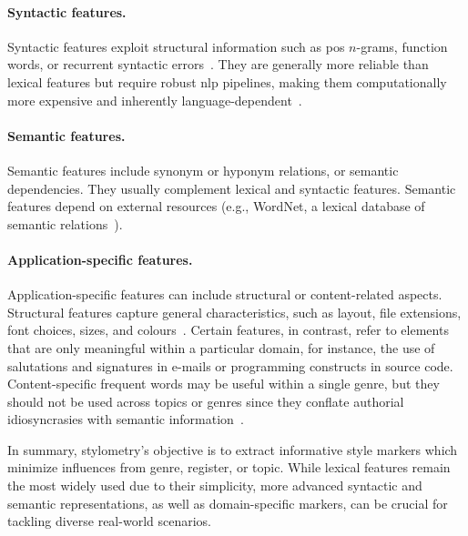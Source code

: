 \paragraph{Syntactic features.}
Syntactic features exploit structural information such as \ac{pos} $n$-grams, function words, or recurrent syntactic errors~\citep{stamatatos_survey_2009,abbasi_writeprints_2008}.
They are generally more reliable than lexical features but require robust \ac{nlp} pipelines, making them computationally more expensive and inherently language-dependent~\citep{neal_surveying_2018,stamatatos_survey_2009}.

\paragraph{Semantic features.}
Semantic features include synonym or hyponym relations, or semantic dependencies. 
They usually complement lexical and syntactic features. 
Semantic features depend on external resources (e.g., WordNet, a lexical database of semantic relations~\citep{zhou_paraphrase_2025}).


\paragraph{Application-specific features.} %

Application-specific features can include structural or content-related aspects. 
Structural features capture general characteristics, such as layout, file extensions, font choices, sizes, and colours~\citep{abbasi_writeprints_2008,neal_surveying_2018}. 
Certain features, in contrast, refer to elements that are only meaningful within a particular domain, for instance, the use of salutations and signatures in e-mails or programming constructs in source code. 
Content-specific frequent words may be useful within a single genre, but they should not be used across topics or genres since they conflate authorial idiosyncrasies with semantic information~\citep{abbasi_writeprints_2008}.


In summary, stylometry's objective is to extract informative style markers which minimize influences from genre, register, or topic. 
While lexical features remain the most widely used due to their simplicity, more advanced syntactic and semantic representations, as well as domain-specific markers, can be crucial for tackling diverse real-world scenarios.
